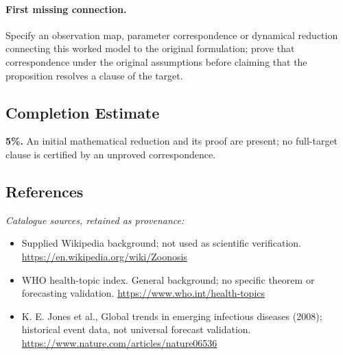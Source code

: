 \documentclass[11pt]{article}
\begin{document}
\paragraph{First missing connection.} Specify an observation map, parameter correspondence or dynamical reduction connecting this worked model to the original formulation; prove that correspondence under the original assumptions before claiming that the proposition resolves a clause of the target.
\subsection{Completion Estimate}
\textbf{5\%.} An initial mathematical reduction and its proof are present; no full-target clause is certified by an unproved correspondence.
\subsection{References}
\noindent\emph{Catalogue sources, retained as provenance:}
\begin{itemize}
\item Supplied Wikipedia background; not used as scientific verification. \url{https://en.wikipedia.org/wiki/Zoonosis}
\item WHO health-topic index. General background; no specific theorem or forecasting validation. \url{https://www.who.int/health-topics}
\item K. E. Jones et al., Global trends in emerging infectious diseases (2008); historical event data, not universal forecast validation. \url{https://www.nature.com/articles/nature06536}
\end{itemize}
\end{document}
